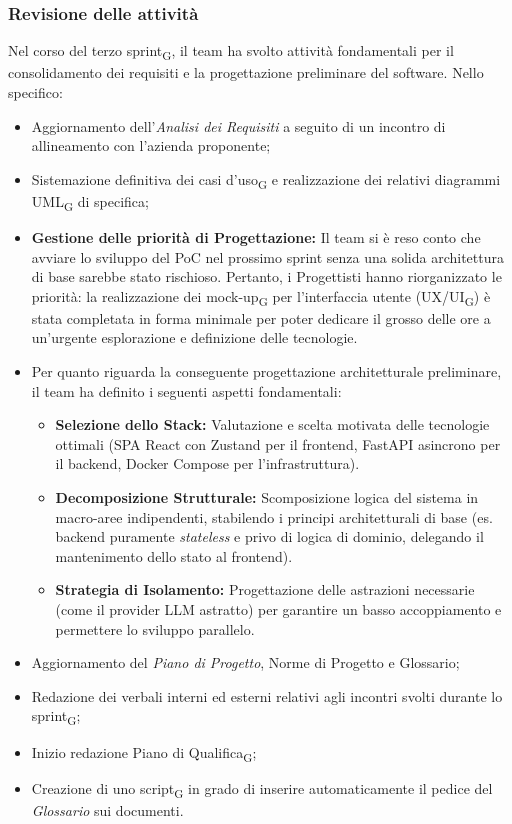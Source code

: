 \documentclass[a4paper, 10pt, colorlinks=true, linkcolor=black, urlcolor=blue, citecolor=blue, hidelinks]{article}
\begin{document}
\subsubsection{Revisione delle attività}
Nel corso del terzo sprint\textsubscript{G}, il team ha svolto attività fondamentali per il consolidamento dei requisiti e la progettazione preliminare del software. Nello specifico:
\begin{itemize}
    \item Aggiornamento dell'\textit{Analisi dei Requisiti} a seguito di un incontro di allineamento con l'azienda proponente;
    \item Sistemazione definitiva dei casi d'uso\textsubscript{G} e realizzazione dei relativi diagrammi UML\textsubscript{G} di specifica;
    \item \textbf{Gestione delle priorità di Progettazione:} Il team si è reso conto che avviare lo sviluppo del PoC nel prossimo sprint senza una solida architettura di base sarebbe stato rischioso. Pertanto, i Progettisti hanno riorganizzato le priorità: la realizzazione dei mock-up\textsubscript{G} per l'interfaccia utente (UX/UI\textsubscript{G}) è stata completata in forma minimale per poter dedicare il grosso delle ore a un'urgente esplorazione e definizione delle tecnologie.
    \item Per quanto riguarda la conseguente progettazione architetturale preliminare, il team ha definito i seguenti aspetti fondamentali:
    \begin{itemize}
        \item \textbf{Selezione dello Stack:} Valutazione e scelta motivata delle tecnologie ottimali (SPA React con Zustand per il frontend, FastAPI asincrono per il backend, Docker Compose per l'infrastruttura).
        \item \textbf{Decomposizione Strutturale:} Scomposizione logica del sistema in macro-aree indipendenti, stabilendo i principi architetturali di base (es. backend puramente \textit{stateless} e privo di logica di dominio, delegando il mantenimento dello stato al frontend).
        \item \textbf{Strategia di Isolamento:} Progettazione delle astrazioni necessarie (come il provider LLM astratto) per garantire un basso accoppiamento e permettere lo sviluppo parallelo.
    \end{itemize}
    \item Aggiornamento del \textit{Piano di Progetto}, Norme di Progetto e Glossario;
    \item Redazione dei verbali interni ed esterni relativi agli incontri svolti durante lo sprint\textsubscript{G};
    \item Inizio redazione Piano di Qualifica\textsubscript{G};
    \item Creazione di uno script\textsubscript{G} in grado di inserire automaticamente il pedice del \textit{Glossario} sui documenti.
\end{itemize}
\end{document}

